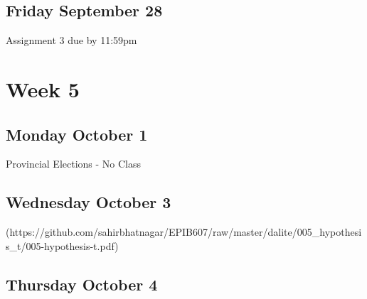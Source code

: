 \documentclass[]{book}
\let\originaltabular\tabular
\let\endoriginaltabular\endtabular
\renewenvironment{tabular}[1]{%
  \begingroup%
  \centering%
  \originaltabular{#1}}%
  {\endoriginaltabular\endgroup}
\theoremstyle{definition}
\theoremstyle{definition}
\theoremstyle{definition}
\theoremstyle{remark}
\begin{document}
\subsection{Friday September 28}\label{friday-september-28}

\begin{table}[H]
\centering
\begin{tabular}{l}
\hline
Assignment 3 due by 11:59pm\\
\hline
\end{tabular}
\end{table}

\section{Week 5}\label{week-5}

\subsection{Monday October 1}\label{monday-october-1}

\begin{table}[H]
\centering
\begin{tabular}{l}
\hline
Provincial Elections - No Class\\
\hline
\end{tabular}
\end{table}

\subsection{Wednesday October 3}\label{wednesday-october-3}

\begin{table}[H]
\centering
\begin{tabular}{l}
(https://github.com/sahirbhatnagar/EPIB607/raw/master/dalite/005\_hypothesis\_t/005-hypothesis-t.pdf)\\
\hline
\end{tabular}
\end{table}

\subsection{Thursday October 4}\label{thursday-october-4}
\end{document}
